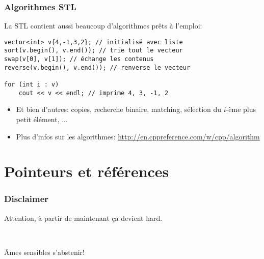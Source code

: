 \documentclass[12pt]{beamer}
\begin{document}
\begin{frame}[fragile]
\frametitle{Algorithmes STL}
La STL contient aussi beaucoup d'algorithmes prêts à l'emploi:
\begin{lstlisting}
vector<int> v{4,-1,3,2}; // initialisé avec liste
sort(v.begin(), v.end()); // trie tout le vecteur
swap(v[0], v[1]); // échange les contenus
reverse(v.begin(), v.end()); // renverse le vecteur

for (int i : v)
    cout << v << endl; // imprime 4, 3, -1, 2
\end{lstlisting}
\begin{itemize}
\item Et bien d'autres: copies, recherche binaire, matching, sélection du $i$-ème plus petit élément, ...
\item Plus d'infos sur les algorithmes: \url{http://en.cppreference.com/w/cpp/algorithm}
\end{itemize}
\end{frame}


\section{Pointeurs et références}

\begin{frame}
\frametitle{Disclaimer}
Attention, à partir de maintenant ça devient hard.

~

Âmes sensibles s'abstenir!
\end{frame}
\end{document}
